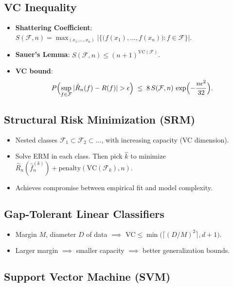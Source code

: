 \documentclass[10pt]{article}
\begin{document}
\begin{multicols}{2}
\subsection*{VC Inequality}
\begin{itemize}
\item \textbf{Shattering Coefficient}: $S(\mathcal{F},n)=\max_{(x_1,\ldots,x_n)}|\{\bigl(f(x_1),\ldots,f(x_n)\bigr):f\in\mathcal{F}\}|$.
\item \textbf{Sauer's Lemma}: $S(\mathcal{F},n)\le (n+1)^{\mathrm{VC}(\mathcal{F})}$.
\item \textbf{VC bound}:
\[
P\Bigl(\sup_{f\in\mathcal{F}}|\hat{R}_n(f)-R(f)|>\epsilon\Bigr)
\;\le\;8\,S(\mathcal{F},n)\,\exp\Bigl(-\frac{n\epsilon^2}{32}\Bigr).
\]
\end{itemize}

\subsection*{Structural Risk Minimization (SRM)}
\begin{itemize}
\item Nested classes $\mathcal{F}_1\subset\mathcal{F}_2\subset\dots$, with increasing capacity (VC dimension).
\item Solve ERM in each class. Then pick $\hat{k}$ to minimize $\hat{R}_n(\hat{f}_n^{(k)})+\mathrm{penalty}(\mathrm{VC}(\mathcal{F}_k),n)$.
\item Achieves compromise between empirical fit and model complexity.
\end{itemize}

\subsection*{Gap-Tolerant Linear Classifiers}
\begin{itemize}
\item Margin $M$, diameter $D$ of data $\implies$ $\mathrm{VC}\le \min\bigl(\lceil (D/M)^2\rceil,d+1\bigr)$.
\item Larger margin $\implies$ smaller capacity $\implies$ better generalization bounds.
\end{itemize}

\subsection*{Support Vector Machine (SVM)}


\end{multicols}
\end{document}
